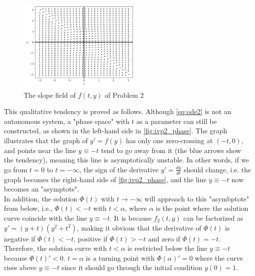\documentclass[a4paper]{article}
\begin{document}
	\begin{figure}[H]
		\centering
		\includegraphics[width=6cm]{img/slope_field2.png}
		\caption{\label{fig:slope_field2} The slope field of $f(t, y)$ of Problem 2}
	\end{figure}
	
    \begin{table}[H]
    \centering
    \caption{Using Four Euler Method to Compute y Value}
    \label{tab:IVP2_y}
    \end{table}
    
    This qualitative tendency is proved as follows. Although \autoref{eq:ode2} is not an autonomous system, a "phase space" with $t$ as a parameter can still be constructed, as shown in the left-hand side in \autoref{fig:ivp2_phase}. The graph illustrates that the graph of $y' = f(y)$ has only one zero-crossing at $(-t, 0)$, and points near the line $y \equiv -t$ tend to go away from it (the blue arrows show the tendency), meaning this line is asymptotically unstable. In other words, if we go from $t = 0$ to $t = -\infty$, the sign of the derivative $y' = \frac{dy}{dt}$ should change, i.e. the graph becomes the right-hand side of \autoref{fig:ivp2_phase}, and the line $y \equiv -t$ now becomes an "asymptote". \\
    
    In addition, the solution $\Phi(t)$ with $t \rightarrow -\infty$ will approach to this "asymbptote" from below, i.e., $\Phi(t) < -t$ with $t < \alpha$, where $\alpha$ is the point where the solution curve coincide with the line $y \equiv -t$. It is because $f_2(t, y)$ can be factorized as $y' = (y + t)(y^2 + t^2)$, making it obvious that the derivative of $\Phi(t)$ is negative if $\Phi(t) < -t$, positive if $\Phi(t) > -t$ and zero if $\Phi(t) = -t$. Therefore, the solution curve with $t < \alpha$ is restricted below the line $y \equiv -t$ because $\Phi(t)' < 0$. $t = \alpha$ is a turning point with $\Phi(\alpha)' = 0$ where the curve rises above $y \equiv -t$ since it should go through the initial condition $y(0) = 1$.
    
\end{document}
